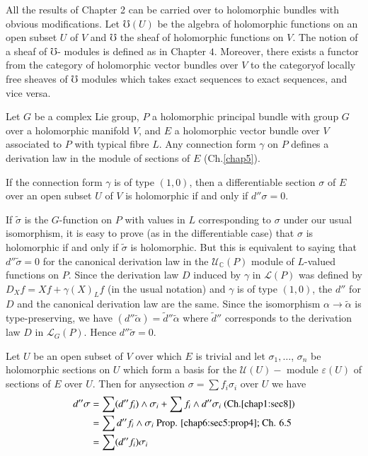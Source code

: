All the results of Chapter 2 can be carried over to holomorphic
bundles with obvious modifications. Let $\mho (U)$ be the algebra of
holomorphic functions on an open subset $U$ of $V$ and $\mho$ the
sheaf of holomorphic functions on $V$. The notion of a sheaf of
$\mho$- modules is defined as in Chapter $4$. Moreover, there exists a
functor from the category of holomorphic vector bundles over $V$ to
the category\pageoriginale of locally free sheaves of $\mho$ modules which takes
exact sequences to exact sequences, and vice versa. 

Let $G$ be a complex Lie group, $P$ a holomorphic principal bundle
with group $G$ over a holomorphic manifold $V$, and $E$ a holomorphic
vector bundle over $V$ associated to $P$ with typical fibre $L$. Any
connection form $\gamma$ on $P$ defines a derivation law in the module
of sections of $E$ (Ch.\ref{chap5}). 

\begin{proposition}\label{chap6:sec5:prop4}%
  If the connection form $\gamma$ is of type $(1, 0)$, then a
  differentiable section $\sigma$ of $E$ over an open subset $U$ of
  $V$ is holomorphic if and only if $d'' \sigma = 0$. 
\end{proposition}

If $ \tilde{\sigma}$ is the $G$-function on $P$ with values in $L$
corresponding to $\sigma$ under our usual isomorphism, it is easy to
prove (as in the differentiable case) that $\sigma$ is holomorphic if
and only if $\tilde{\sigma}$ is holomorphic. But this is equivalent to
saying that $d '' \tilde{\sigma} = 0$ for the canonical derivation law
in the $\mathscr{U}_\mathbb{C}(P)$ module of $L$-valued functions on
$P$. Since the derivation law $D$ induced by $\gamma$ in
$\mathscr{L}(P)$ was defined by $D_X f = X f + \gamma (X)_L f$ (in the
usual notation) and $\gamma$ is of type $(1,0)$, the $d''$ for $D$ and
the canonical derivation law are the same. Since the isomorphism
$\alpha \to \tilde{\alpha}$ is type-preserving, we have $(d''
\tilde{\alpha}) = \tilde{d}'' \tilde{\alpha}$ where $\tilde{d}''$
corresponds to the derivation law $D$ in $\mathscr{L}_{G}(P)$. Hence
$d'' \tilde{\sigma} = 0$. 

Let $U$ be an open subset of $V$ over which $E$ is trivial and let
$\sigma_1,\ldots$, $\sigma_n$ be holomorphic sections on $U$ which form
a basis for the $\mathscr{U}(U)-$ module $\varepsilon (U)$ of sections
of $E$ over $U$. Then for any\pageoriginale section $\sigma = \sum f_i \sigma_i$
over $U$ we have 
\begin{align*}
  d'' \sigma & = \sum (d'' f_i) \wedge \sigma_i + \sum f_i \wedge d''
  \sigma_i ~\text{(Ch.\ref{chap1:sec8})}\\ 
  & = \sum d'' f_i \wedge \sigma_i \text{
    Prop. \ref{chap6:sec5:prop4}; Ch. 6.5}\\ 
  & = \sum (d'' f_i) \sigma_i
\end{align*}

